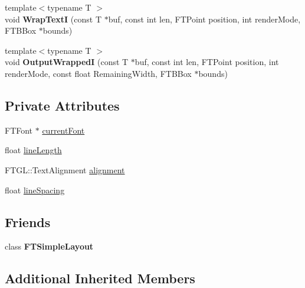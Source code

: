 \begin{DoxyCompactItemize}
\item 
{\footnotesize template$<$typename T $>$ }\\void {\bfseries Wrap\+TextI} (const T $\ast$buf, const int len, F\+T\+Point position, int render\+Mode, F\+T\+B\+Box $\ast$bounds)\hypertarget{class_f_t_simple_layout_impl_ad34461418ac61f886e93260fea978e00}{}\label{class_f_t_simple_layout_impl_ad34461418ac61f886e93260fea978e00}

\item 
{\footnotesize template$<$typename T $>$ }\\void {\bfseries Output\+WrappedI} (const T $\ast$buf, const int len, F\+T\+Point position, int render\+Mode, const float Remaining\+Width, F\+T\+B\+Box $\ast$bounds)\hypertarget{class_f_t_simple_layout_impl_a17a19357f263f81a08b0357f2fbacb9e}{}\label{class_f_t_simple_layout_impl_a17a19357f263f81a08b0357f2fbacb9e}

\end{DoxyCompactItemize}
\subsection*{Private Attributes}
\begin{DoxyCompactItemize}
\item 
F\+T\+Font $\ast$ \hyperlink{class_f_t_simple_layout_impl_af77c6b00911959673e6e45275bccd128}{current\+Font}
\item 
float \hyperlink{class_f_t_simple_layout_impl_a46da513a479522dd9fe9ab752a761b3e}{line\+Length}
\item 
F\+T\+G\+L\+::\+Text\+Alignment \hyperlink{class_f_t_simple_layout_impl_a0f0edb7cdf27a22fe66f635c56aa0dbd}{alignment}
\item 
float \hyperlink{class_f_t_simple_layout_impl_a0afb3dda6e096069602a8df941293605}{line\+Spacing}
\end{DoxyCompactItemize}
\subsection*{Friends}
\begin{DoxyCompactItemize}
\item 
class {\bfseries F\+T\+Simple\+Layout}\hypertarget{class_f_t_simple_layout_impl_ae27eaa779922d14c8eb0f476456c7099}{}\label{class_f_t_simple_layout_impl_ae27eaa779922d14c8eb0f476456c7099}

\end{DoxyCompactItemize}
\subsection*{Additional Inherited Members}


